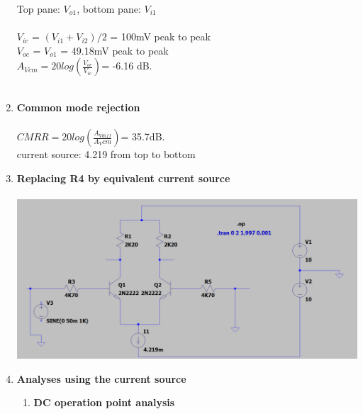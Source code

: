 \documentclass{article}
\begin{document}
\begin{enumerate}
		Top pane: \(V_{o1}\), bottom pane: \(V_{i1}\)\\\\
		\(V_{ic}\) = \((V_{i1} + V_{i2})/2\) = 100mV peak to peak\\
		\(V_{oc}\) = \(V_{o1}\) = 49.18mV peak to peak\\
		\(A_{Vcm} = 20log(\frac{V_{oc}}{V_{ic}}) \)= -6.16 dB.\\\\
		\item \textbf{Common mode rejection}\\\\
		\(CMRR = 20 log (\frac{A_{Vdiff}}{A_Vcm}) \)= 35.7dB.\\
		\pagebreak
		current source: 4.219 from top to bottom
		\item \textbf{Replacing R4 by equivalent current source}\\\\
		\includegraphics[scale=0.4]{prelab 4/circuit 5}
		\item \textbf{Analyses using the current source}
		\begin{enumerate}
			\item \textbf{DC operation point analysis}\\\\
			

\end{enumerate}
\end{enumerate}
\end{document}
